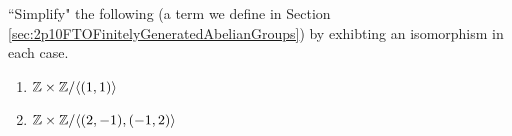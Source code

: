 \documentclass[../algebraNotesMSRI-UP2016.tex]{subfiles}
\begin{document}
%

\begin{frame}[c]
\begin{exe}[cf. Problem 72]\label{exe:prob72}
``Simplify" the following  (a term we define in Section \ref{sec:2p10FTOFinitelyGeneratedAbelianGroups}) by exhibting an isomorphism in each case.
\begin{enumerate}
\item $\mathbb Z\times \mathbb Z/\langle(1,1)\rangle$
\item\label{exept:prob72-2} $\mathbb Z\times \mathbb Z/\langle(2,-1),(-1,2)\rangle$
\end{enumerate} 
\end{exe}
\end{frame}
\end{document}
